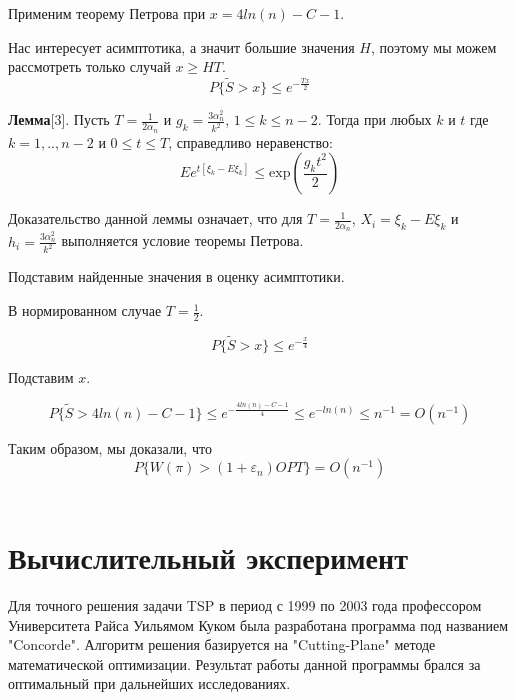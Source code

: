\documentclass[a4paper, 14pt]{extarticle}
\numberwithin{equation}{section}
\begin{document}
Применим теорему Петрова при $x = 4ln(n) - C - 1 $.

Нас интересует асимптотика, а значит большие значения $H$, поэтому мы можем рассмотреть только случай $x \geqslant HT$.
\begin{equation}
P\{\tilde{S} >x \} \leqslant e^{-\frac{Tx}{2}}
\end{equation}

\textbf{Лемма}[3]. Пусть $T = \frac{1}{2\alpha_n}$ и $g_k = \frac{3\alpha_n^2}{k^2}$, $1 \leqslant k \leqslant n-2$. Тогда при любых $k$ и $t$ где $k=1,..,n-2$ и $0 \leqslant t \leqslant T$, справедливо неравенство:
\begin{equation}
Ee^{t[\xi_k-E\xi_k]} \leqslant \mathrm{exp}(\frac{g_k t^2}{2})
\end{equation}


Доказательство данной леммы означает, что для $T = \frac{1}{2\alpha_n}$, $X_i = \xi_k-E\xi_k$ и $h_i = \frac{3\alpha_n^2}{k^2}$ выполняется условие теоремы Петрова.

Подставим найденные значения в оценку асимптотики.

В нормированном случае $T = \frac{1}{2}$.

\begin{equation}
P\{\tilde{S} >x \} \leqslant e^{-\frac{x}{4}}
\end{equation}

Подставим $x$.

\begin{equation}
P\{\tilde{S} >4ln(n) - C - 1 \} \leqslant e^{-\frac{4ln(n) - C - 1}{4}} \leqslant e^{-ln(n)} \leqslant n^{-1} = O(n^{-1})
\end{equation}

Таким образом, мы доказали, что
\begin{equation}
P\{ W(\pi)>(1+\varepsilon_n)OPT \} = O(n^{-1})
\end{equation}\\



\section{Вычислительный эксперимент}


Для точного решения задачи TSP в период с 1999 по 2003 года профессором Университета Райса Уильямом Куком была разработана программа под названием "Concorde". Алгоритм решения базируется на "Cutting-Plane" методе математической оптимизации. Результат работы данной программы брался за оптимальный при дальнейших исследованиях.
\end{document}
